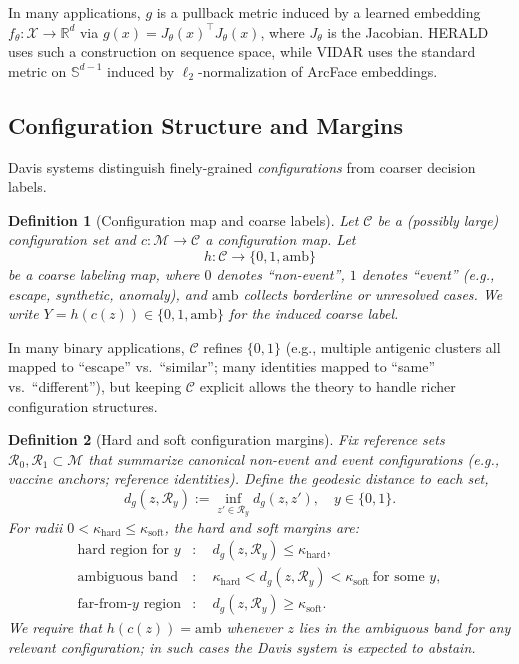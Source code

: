 \documentclass[11pt]{article}
\newtheorem{definition}{Definition}
\begin{document}
In many applications, $g$ is a pullback metric induced by a learned embedding
$f_\theta:\mathcal{X} \to \mathbb{R}^d$ via $g(x) = J_\theta(x)^\top J_\theta(x)$, where
$J_\theta$ is the Jacobian. HERALD uses such a construction on sequence space, while VIDAR
uses the standard metric on $\mathbb{S}^{d-1}$ induced by $\ell_2$-normalization of
ArcFace embeddings.

\subsection{Configuration Structure and Margins}
\label{subsec:config}

Davis systems distinguish finely-grained \emph{configurations} from coarser decision labels.

\begin{definition}[Configuration map and coarse labels]
Let $\mathcal{C}$ be a (possibly large) configuration set and
$c:\mathcal{M} \to \mathcal{C}$ a configuration map. Let
\[
    h:\mathcal{C} \to \{0,1,\mathrm{amb}\}
\]
be a coarse labeling map, where $0$ denotes ``non-event'', $1$ denotes ``event'' (e.g.,
escape, synthetic, anomaly), and $\mathrm{amb}$ collects borderline or unresolved cases.
We write $Y = h(c(z)) \in \{0,1,\mathrm{amb}\}$ for the induced coarse label.
\end{definition}

In many binary applications, $\mathcal{C}$ refines $\{0,1\}$ (e.g., multiple antigenic clusters
all mapped to ``escape'' vs.\ ``similar''; many identities mapped to ``same'' vs.\ ``different''), but
keeping $\mathcal{C}$ explicit allows the theory to handle richer configuration structures.

\begin{definition}[Hard and soft configuration margins]\label{def:davis-config}
Fix reference sets $\mathcal{R}_0,\mathcal{R}_1 \subset \mathcal{M}$ that summarize
canonical non-event and event configurations (e.g., vaccine anchors; reference identities).
Define the geodesic distance to each set,
\[
    d_g(z,\mathcal{R}_y) := \inf_{z'\in\mathcal{R}_y} d_g(z,z'), \quad y\in\{0,1\}.
\]
For radii $0 < \kappa_{\mathrm{hard}} \le \kappa_{\mathrm{soft}}$, the hard and soft
margins are:
\begin{align*}
    \text{hard region for } y &: \quad d_g(z,\mathcal{R}_y) \le \kappa_{\mathrm{hard}},\\
    \text{ambiguous band} &: \quad \kappa_{\mathrm{hard}} < d_g(z,\mathcal{R}_y)
        < \kappa_{\mathrm{soft}}\ \text{for some $y$}, \\
    \text{far-from-$y$ region} &: \quad d_g(z,\mathcal{R}_y) \ge \kappa_{\mathrm{soft}}.
\end{align*}
We require that $h(c(z)) = \mathrm{amb}$ whenever $z$ lies in the ambiguous band for
any relevant configuration; in such cases the Davis system is expected to abstain.
\end{definition}
\end{document}
